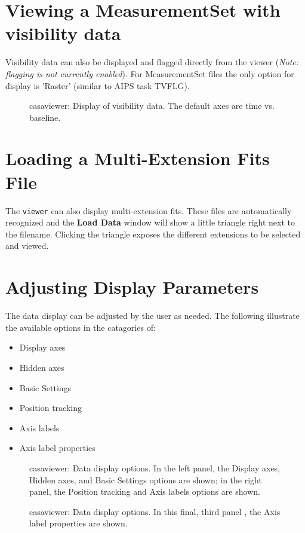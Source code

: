 \section{Viewing a MeasurementSet with visibility data}
\label{section:viewer.MS}

Visibility data can also be displayed and flagged directly from the
viewer ({\it Note: flagging is not currently enabled}). For
MeasurementSet files the only option for display is 'Raster' (similar
to AIPS task TVFLG).

\begin{figure}[h]
\caption{\label{fig:viewer_ms1} casaviewer: Display of visibility
  data. The default axes are time vs. baseline.} 
\hrulefill
\end{figure}
 


\section{Loading a Multi-Extension Fits File}
\label{section:viewer.multiextensionfits}
The {\tt viewer} can also display multi-extension fits. These files
are automatically recognized and the {\bf Load Data} window will
show a little triangle right next to the filename. Clicking the
triangle exposes the different extensions to be selected and viewed.

\section{Adjusting Display Parameters}
\label{section:viewer.adjust}

The data display can be adjusted by the user as needed. The following
illustrate the available options in the catagories of: 
\begin{itemize}
   \item Display axes
   \item Hidden axes
   \item Basic Settings
   \item Position tracking
   \item Axis labels
   \item Axis label properties
\end{itemize}

\begin{figure}[ht]
\caption{\label{fig:datadisplay} casaviewer: Data display options. In
  the left panel, the Display axes, Hidden axes, and Basic Settings
  options are shown; in the right panel, the Position tracking and
  Axis labels options are shown. }

\end{figure}
\begin{figure}[h]
\caption{\label{fig:datadisplay-p3} casaviewer: Data display options. In
  this final, third panel , the Axis label properties are shown. }
\hrulefill
\end{figure}
 

